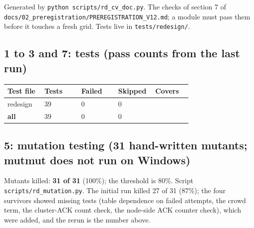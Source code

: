 


Generated by \texttt{python scripts/rd\_cv\_doc.py}. The checks of section 7 of \texttt{docs/02\_preregistration/PREREGISTRATION\_V12.md}; a module must pass them before it touches a fresh grid. Tests live in \texttt{tests/redesign/}.

\subsection*{1 to 3 and 7: tests (pass counts from the last run)}

{\scriptsize\raggedright
\begin{longtable}{p{0.190\linewidth}p{0.190\linewidth}p{0.190\linewidth}p{0.190\linewidth}p{0.190\linewidth}}
\toprule
Test file & Tests & Failed & Skipped & Covers \\
\midrule
\endhead
redesign & 39 & 0 & 0 &  \\
\textbf{all} & 39 & 0 & 0 &  \\
\bottomrule
\end{longtable}}

\subsection*{5: mutation testing (31 hand-written mutants; mutmut does not run on Windows)}

Mutants killed: \textbf{31 of 31} (100\%); the threshold is 80\%. Script \texttt{scripts/rd\_mutation.py}. The initial run killed 27 of 31 (87\%); the four survivors showed missing tests (table dependence on failed attempts, the crowd term, the cluster-ACK count check, the node-side ACK counter check), which were added, and the rerun is the number above.

